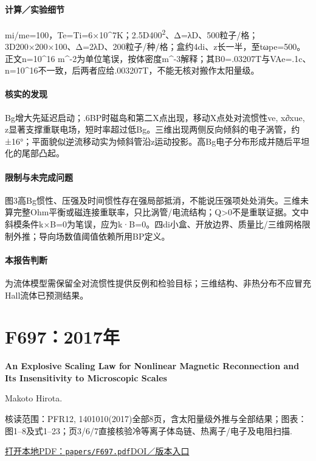 \documentclass[UTF8,a4paper,11pt,openany,fontset=fandol]{ctexbook}
\begin{document}
\paragraph{计算／实验细节}mi/me=100，Te=Ti=6×10\textasciicircum{}7K；2.5D400\textsuperscript{2}、Δ=λD、500粒子/格；3D200×200×100、Δ=2λD、200粒子/种/格；盒约4di、z长一半，至tωpe=500。正文n=10\textasciicircum{}16 m\textasciicircum{}-2为单位笔误，按体密度m\textasciicircum{}-3解释；其B0=.03207T与VAe=.1c、n=10\textasciicircum{}16不一致，后两者应给.003207T，不能无核对搬作太阳量级。

\paragraph{核实的发现}Bg增大先延迟启动；.6BP时磁岛和第二X点出现，移动X点处对流惯性ve, x∂xue, z显著支撑重联电场，短时率超过低Bg。三维出现两侧反向倾斜的电子涡管，约±16°；平面貌似逆流移动实为倾斜管沿z运动投影。高Bg电子分布形成并随后平坦化的尾部凸起。

\paragraph{限制与未完成问题}图3高Bg惯性、压强及时间惯性存在强局部抵消，不能说压强项处处消失。三维未算完整Ohm平衡或磁连接重联率，只比涡管/电流结构；Q>0不是重联证据。文中斜模条件k×B=0为笔误，应为k·B=0。四di小盒、开放边界、质量比/三维网格限制外推；导向场数值阈值依赖所用BP定义。

\paragraph{本报告判断}为流体模型需保留全对流惯性提供反例和检验目标；三维结构、非热分布不应冒充Hall流体已预测结果。

\section{F697：2017年}\label{paper:F697}

\textbf{An Explosive Scaling Law for Nonlinear Magnetic Reconnection and Its Insensitivity to Microscopic Scales}\citep{F697}\

Makoto Hirota.

\textsf{核读范围：}PFR12, 1401010(2017)全部8页，含太阳量级外推与全部结果；\textsf{图表：}图1–8及式1–23；页3/6/7直接核验冷等离子体岛链、热离子/电子及电阻扫描.

\href{run:../papers/F697.pdf}{打开本地PDF：\texttt{papers/F697.pdf}}\quad\href{https://doi.org/10.1585/pfr.12.1401010}{DOI／版本入口}
\end{document}
